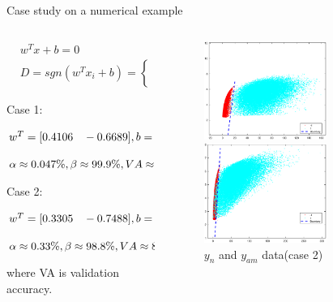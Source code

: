 \documentclass[10pt]{beamer}
\begin{document}
\begin{frame}{Case study on a numerical example}
    \begin{columns}
             \begin{column}{0.5\textwidth}
 \begin{small}
\begin{equation} \nonumber
\begin{aligned}
& w^Tx+b=0  \\
& D=sgn(w^Tx_i+b) = \left\{ 
    \begin{aligned}
  & -1  \\
  &\quad 1 
  \end{aligned}
     \right.
\end{aligned}
\end{equation}
\end{small}
 Case 1: \par  $\small{w^T = [ 0.4106 \quad -0.6689]
 , b = -3.473} $\par $\small{\alpha \approx 0.047\%,\beta  \approx  99.9\%,VA \approx 99.93\%}$ \par 
Case 2:  \par $\small{w^T = [0.3305 \quad -0.7488]
 , b = -0.8336} $\par $\small{\alpha \approx 0.33\%  ,\beta  \approx  98.8 \%,VA \approx 89.83 \%}$ \par
 where VA is validation accuracy.
           \end{column}
        \begin{column}{0.5\textwidth} 
         \begin{figure}
        \centering
        \includegraphics[width=4cm]{fig/addHyper.eps}
        \caption{$y_n$ and $y_a$ data(case 1)}
        \includegraphics[width=4cm]{fig/ALhyperplane.eps}
        \caption{$y_n$ and $y_{am}$ data(case 2)}
        \end{figure}
        \end{column}
    \end{columns}
\end{frame}
\end{document}
